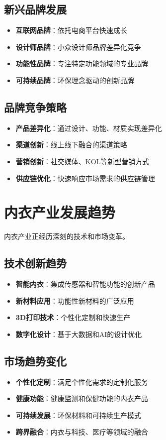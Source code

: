 \documentclass[12pt,UTF8]{ctexbook}
\begin{document}
\subsection{新兴品牌发展}
\begin{itemize}[leftmargin=2cm]
	\item \textbf{互联网品牌}：依托电商平台快速成长
	\item \textbf{设计师品牌}：小众设计师品牌差异化竞争
	\item \textbf{功能性品牌}：专注特定功能领域的专业品牌
	\item \textbf{可持续品牌}：环保理念驱动的创新品牌
\end{itemize}

\subsection{品牌竞争策略}
\begin{itemize}[leftmargin=2cm]
	\item \textbf{产品差异化}：通过设计、功能、材质实现差异化
	\item \textbf{渠道创新}：线上线下融合的渠道策略
	\item \textbf{营销创新}：社交媒体、KOL等新型营销方式
	\item \textbf{供应链优化}：快速响应市场需求的供应链管理
\end{itemize}

\section{内衣产业发展趋势}
内衣产业正经历深刻的技术和市场变革。

\subsection{技术创新趋势}
\begin{itemize}[leftmargin=2cm]
	\item \textbf{智能内衣}：集成传感器和智能功能的创新产品
	\item \textbf{新材料应用}：功能性新材料的广泛应用
	\item \textbf{3D打印技术}：个性化定制和快速生产
	\item \textbf{数字化设计}：基于大数据和AI的设计优化
\end{itemize}

\subsection{市场趋势变化}
\begin{itemize}[leftmargin=2cm]
	\item \textbf{个性化定制}：满足个性化需求的定制化服务
	\item \textbf{健康功能}：健康监测和保健功能的内衣产品
	\item \textbf{可持续发展}：环保材料和可持续生产模式
	\item \textbf{跨界融合}：内衣与科技、医疗等领域的融合
\end{itemize}
\end{document}
